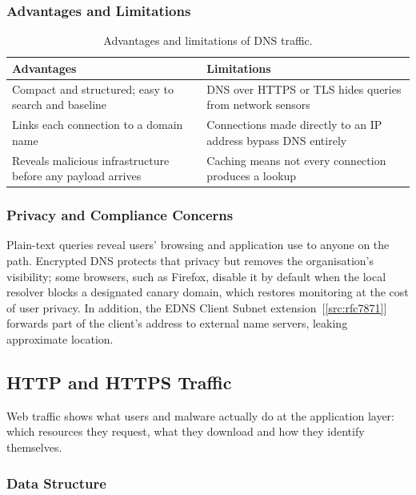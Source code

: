 \subsubsection{Advantages and Limitations}

\begin{table}[htbp]
  \centering
  \caption{Advantages and limitations of DNS traffic.}
  \label{tab:dns-pros}
  \begin{tabularx}{\linewidth}{@{}YY@{}}
    \toprule
    \textbf{Advantages} & \textbf{Limitations} \\
    \midrule
    Compact and structured; easy to search and baseline
      & DNS over HTTPS or TLS hides queries from network sensors \\
    Links each connection to a domain name
      & Connections made directly to an IP address bypass DNS entirely \\
    Reveals malicious infrastructure before any payload arrives
      & Caching means not every connection produces a lookup \\
    \bottomrule
  \end{tabularx}
\end{table}

\subsubsection{Privacy and Compliance Concerns}

Plain-text queries reveal users' browsing and application use to anyone on the path. Encrypted DNS protects that privacy but removes the organisation's visibility; some browsers, such as Firefox, disable it by default when the local resolver blocks a designated canary domain, which restores monitoring at the cost of user privacy. In addition, the EDNS Client Subnet extension~[\ref{src:rfc7871}] forwards part of the client's address to external name servers, leaking approximate location.

\subsection{HTTP and HTTPS Traffic}
\label{sec:http}

Web traffic shows what users and malware actually do at the application layer: which resources they request, what they download and how they identify themselves.

\subsubsection{Data Structure}

